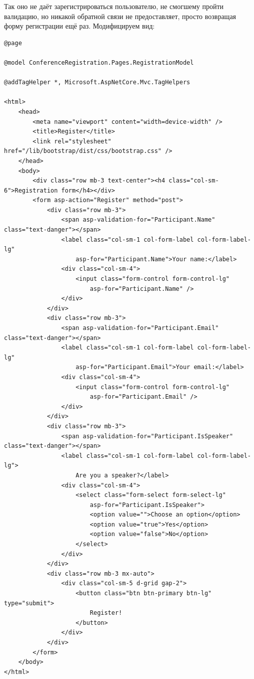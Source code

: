 \documentclass[a5paper]{article}
\begin{document}
Так оно не даёт зарегистрироваться пользователю, не смогшему пройти валидацию, но никакой обратной связи не предоставляет, просто возвращая форму регистрации ещё раз. Модифицируем вид:

\begin{verbatim}
@page

@model ConferenceRegistration.Pages.RegistrationModel

@addTagHelper *, Microsoft.AspNetCore.Mvc.TagHelpers

<html>
    <head>
        <meta name="viewport" content="width=device-width" />
        <title>Register</title>
        <link rel="stylesheet" href="/lib/bootstrap/dist/css/bootstrap.css" />
    </head>
    <body>
        <div class="row mb-3 text-center"><h4 class="col-sm-6">Registration form</h4></div>
        <form asp-action="Register" method="post">
            <div class="row mb-3">
                <span asp-validation-for="Participant.Name" class="text-danger"></span>
                <label class="col-sm-1 col-form-label col-form-label-lg" 
                    asp-for="Participant.Name">Your name:</label>
                <div class="col-sm-4">
                    <input class="form-control form-control-lg" 
                        asp-for="Participant.Name" />
                </div>
            </div>
            <div class="row mb-3">
                <span asp-validation-for="Participant.Email" class="text-danger"></span>
                <label class="col-sm-1 col-form-label col-form-label-lg" 
                    asp-for="Participant.Email">Your email:</label>
                <div class="col-sm-4">
                    <input class="form-control form-control-lg" 
                        asp-for="Participant.Email" />
                </div>
            </div>
            <div class="row mb-3">
                <span asp-validation-for="Participant.IsSpeaker" class="text-danger"></span>
                <label class="col-sm-1 col-form-label col-form-label-lg">
                    Are you a speaker?</label>
                <div class="col-sm-4">
                    <select class="form-select form-select-lg" 
                        asp-for="Participant.IsSpeaker">
                        <option value="">Choose an option</option>
                        <option value="true">Yes</option>
                        <option value="false">No</option>
                    </select>
                </div>
            </div>
            <div class="row mb-3 mx-auto">
                <div class="col-sm-5 d-grid gap-2">
                    <button class="btn btn-primary btn-lg" type="submit">
                        Register!
                    </button>
                </div>
            </div>
        </form>
    </body>
</html>
\end{verbatim}
\end{document}
